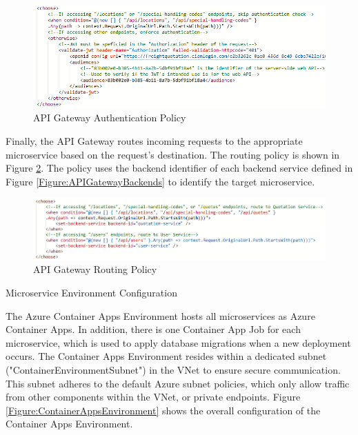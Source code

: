 \documentclass[12pt, reqno, oneside]{amsbook}
\makeatletter
\def\subsection{\@startsection{subsection}{2}%
      \z@{.5\linespacing\@plus.7\linespacing}{.25\linespacing}%
      {\normalfont\bfseries\flushleft}}
\theoremstyle{definition}
\theoremstyle{definition}
\numberwithin{section}{chapter}
\numberwithin{table}{chapter}
\numberwithin{figure}{chapter}
\makeatother
\begin{document}
\begin{figure}[H]
  \centering
  \includegraphics[width=0.9\linewidth]{images/APIGatewayConfigurationAuthentication.png}
  \caption{\label{Figure:APIGatewayConfigurationAuthentication}API Gateway Authentication Policy}
\end{figure}

Finally, the \ac{API} Gateway routes incoming requests to the appropriate microservice based on the request's destination. The routing policy is shown in Figure \ref{Figure:APIGatewayConfigurationRouting}. The policy uses the backend identifier of each backend service defined in Figure \ref{Figure:APIGatewayBackends} to identify the target microservice.

\begin{figure}[H]
  \centering
  \includegraphics[width=1\linewidth]{images/APIGatewayConfigurationRouting.png}
  \caption{\label{Figure:APIGatewayConfigurationRouting}API Gateway Routing Policy}
\end{figure}

\subsection{Microservice Environment Configuration}
\label{Subsection:Microservice_Environment_Configuration}

The Azure Container Apps Environment hosts all microservices as Azure Container Apps. In addition, there is one Container App Job for each microservice, which is used to apply database migrations when a new deployment occurs. The Container Apps Environment resides within a dedicated subnet ("ContainerEnvironmentSubnet") in the \ac{VNet} to ensure secure communication. This subnet adheres to the default Azure subnet policies, which only allow traffic from other components within the \ac{VNet}, or private endpoints. Figure \ref{Figure:ContainerAppsEnvironment} shows the overall configuration of the Container Apps Environment.
\end{document}
